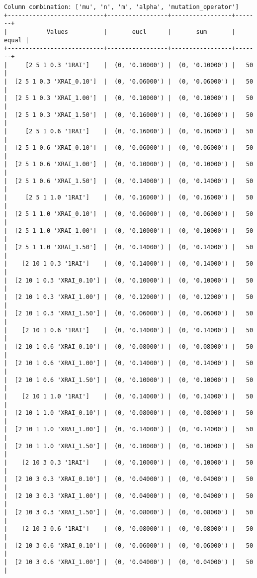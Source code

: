 \documentclass{article}
\begin{document}
\begin{verbatim}
Column combination: ['mu', 'n', 'm', 'alpha', 'mutation_operator']
+---------------------------+-----------------+-----------------+-------+
|           Values          |       eucl      |       sum       | equal |
+---------------------------+-----------------+-----------------+-------+
|     [2 5 1 0.3 '1RAI']    |  (0, '0.10000') |  (0, '0.10000') |   50  |
|  [2 5 1 0.3 'XRAI_0.10']  |  (0, '0.06000') |  (0, '0.06000') |   50  |
|  [2 5 1 0.3 'XRAI_1.00']  |  (0, '0.10000') |  (0, '0.10000') |   50  |
|  [2 5 1 0.3 'XRAI_1.50']  |  (0, '0.16000') |  (0, '0.16000') |   50  |
|     [2 5 1 0.6 '1RAI']    |  (0, '0.16000') |  (0, '0.16000') |   50  |
|  [2 5 1 0.6 'XRAI_0.10']  |  (0, '0.06000') |  (0, '0.06000') |   50  |
|  [2 5 1 0.6 'XRAI_1.00']  |  (0, '0.10000') |  (0, '0.10000') |   50  |
|  [2 5 1 0.6 'XRAI_1.50']  |  (0, '0.14000') |  (0, '0.14000') |   50  |
|     [2 5 1 1.0 '1RAI']    |  (0, '0.16000') |  (0, '0.16000') |   50  |
|  [2 5 1 1.0 'XRAI_0.10']  |  (0, '0.06000') |  (0, '0.06000') |   50  |
|  [2 5 1 1.0 'XRAI_1.00']  |  (0, '0.10000') |  (0, '0.10000') |   50  |
|  [2 5 1 1.0 'XRAI_1.50']  |  (0, '0.14000') |  (0, '0.14000') |   50  |
|    [2 10 1 0.3 '1RAI']    |  (0, '0.14000') |  (0, '0.14000') |   50  |
|  [2 10 1 0.3 'XRAI_0.10'] |  (0, '0.10000') |  (0, '0.10000') |   50  |
|  [2 10 1 0.3 'XRAI_1.00'] |  (0, '0.12000') |  (0, '0.12000') |   50  |
|  [2 10 1 0.3 'XRAI_1.50'] |  (0, '0.06000') |  (0, '0.06000') |   50  |
|    [2 10 1 0.6 '1RAI']    |  (0, '0.14000') |  (0, '0.14000') |   50  |
|  [2 10 1 0.6 'XRAI_0.10'] |  (0, '0.08000') |  (0, '0.08000') |   50  |
|  [2 10 1 0.6 'XRAI_1.00'] |  (0, '0.14000') |  (0, '0.14000') |   50  |
|  [2 10 1 0.6 'XRAI_1.50'] |  (0, '0.10000') |  (0, '0.10000') |   50  |
|    [2 10 1 1.0 '1RAI']    |  (0, '0.14000') |  (0, '0.14000') |   50  |
|  [2 10 1 1.0 'XRAI_0.10'] |  (0, '0.08000') |  (0, '0.08000') |   50  |
|  [2 10 1 1.0 'XRAI_1.00'] |  (0, '0.14000') |  (0, '0.14000') |   50  |
|  [2 10 1 1.0 'XRAI_1.50'] |  (0, '0.10000') |  (0, '0.10000') |   50  |
|    [2 10 3 0.3 '1RAI']    |  (0, '0.10000') |  (0, '0.10000') |   50  |
|  [2 10 3 0.3 'XRAI_0.10'] |  (0, '0.04000') |  (0, '0.04000') |   50  |
|  [2 10 3 0.3 'XRAI_1.00'] |  (0, '0.04000') |  (0, '0.04000') |   50  |
|  [2 10 3 0.3 'XRAI_1.50'] |  (0, '0.08000') |  (0, '0.08000') |   50  |
|    [2 10 3 0.6 '1RAI']    |  (0, '0.08000') |  (0, '0.08000') |   50  |
|  [2 10 3 0.6 'XRAI_0.10'] |  (0, '0.06000') |  (0, '0.06000') |   50  |
|  [2 10 3 0.6 'XRAI_1.00'] |  (0, '0.04000') |  (0, '0.04000') |   50  |

\end{verbatim}
\end{document}
